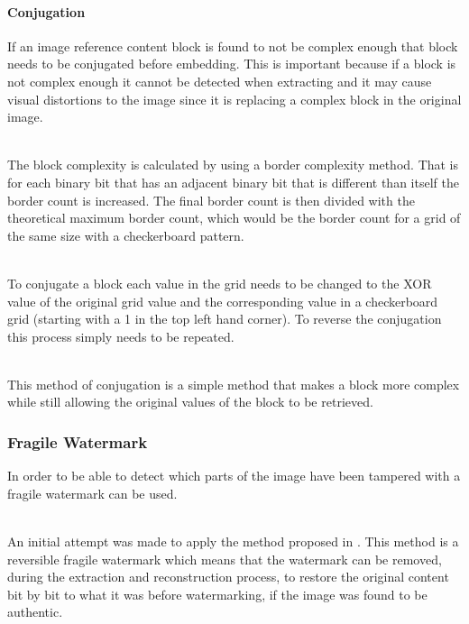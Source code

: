 \documentclass[12pt]{article}
\begin{document}
\paragraph{Conjugation}
If an image reference content block is found to not be complex enough that block needs to be conjugated before embedding.
This is important because if a block is not complex enough it cannot be detected when extracting and it may cause visual distortions to the image since it is replacing a complex block in the original image.

\hspace{0pt} \\
The block complexity is calculated by using a border complexity method. \cite{beaullieubpcs}
That is for each binary bit that has an adjacent binary bit that is different than itself the border count is increased. 
The final border count is then divided with the theoretical maximum border count, which would be the border count for a grid of the same size with a checkerboard pattern.

\hspace{0pt} \\
To conjugate a block each value in the grid needs to be changed to the XOR value of the original grid value and the corresponding value in a checkerboard grid (starting with a 1 in the top left hand corner).
To reverse the conjugation this process simply needs to be repeated.

\hspace{0pt} \\
This method of conjugation is a simple method that makes a block more complex while still allowing the original values of the block to be retrieved.


\subsubsection{Fragile Watermark}
\label{impFragileWatermark}
In order to be able to detect which parts of the image have been tampered with a fragile watermark can be used.

\hspace{0pt} \\
An initial attempt was made to apply the method proposed in \cite{tian2002wavelet}.
This method is a reversible fragile watermark which means that the watermark can be removed, during the extraction and reconstruction process, to restore the original content bit by bit to what it was before watermarking, if the image was found to be authentic.
\end{document}
